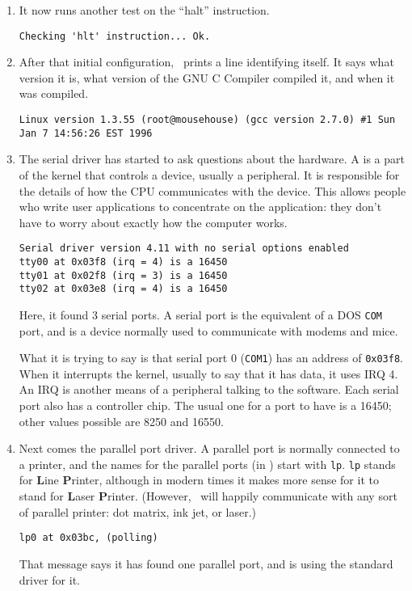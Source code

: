 \begin{enumerate}
\item It now runs another test on the ``halt'' instruction.
\begin{screen}\begin{verbatim}
Checking 'hlt' instruction... Ok.
\end{verbatim}\end{screen}
  
\item After that initial configuration, \linux\ prints a line
  identifying itself.  It says what version it is, what
  version of the GNU C Compiler compiled it, and when it was compiled.
\begin{screen}\begin{verbatim}
Linux version 1.3.55 (root@mousehouse) (gcc version 2.7.0) #1 Sun Jan 7 14:56:26 EST 1996
\end{verbatim}\end{screen}

  \item The serial  driver has started to ask
    questions about the hardware.  A  is a part of the
    kernel that controls a device, usually a peripheral.  It is
    responsible for the details of how the CPU communicates with the
    device.  This allows people who write user applications to
    concentrate on the application: they don't have to worry about
    exactly how the computer works.
\begin{screen}\begin{verbatim}
Serial driver version 4.11 with no serial options enabled
tty00 at 0x03f8 (irq = 4) is a 16450
tty01 at 0x02f8 (irq = 3) is a 16450
tty02 at 0x03e8 (irq = 4) is a 16450
\end{verbatim}\end{screen}
Here, it found 3 serial ports.  A serial port is the equivalent of
a DOS {\tt COM} port, and is a device normally used to
communicate with
modems and mice.

What it is trying to say is that serial port 0 ({\tt COM1}) has an
address of {\tt 0x03f8}. When it interrupts the kernel,
usually to say that it has data, it uses IRQ 4. An IRQ is another
means of a peripheral talking to the software.  Each serial port also
has a controller chip.  The usual one for a port to have is a 16450;
other values possible are 8250 and 16550. 

\item Next comes the parallel port driver.  A parallel port is
normally connected to a printer, and the names for the parallel ports
(in \linux) start with {\tt lp}. {\tt lp} stands for {\bf L}ine {\bf
P}rinter, although in modern times it makes more sense for it to stand
for {\bf L}aser {\bf P}rinter.  (However, \linux\ will happily
communicate with any sort of parallel printer: dot matrix, ink jet, or
laser.)
\begin{screen}\begin{verbatim}
lp0 at 0x03bc, (polling)
\end{verbatim}\end{screen}
That message says it has found one parallel port, and is using the
standard driver for it.


\end{enumerate}
